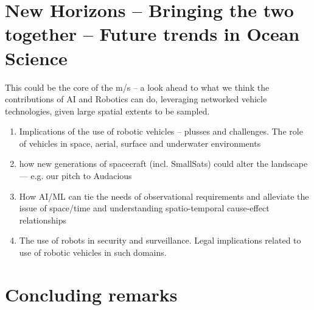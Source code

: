 \documentclass[12pt]{article}
\begin{document}
\section{New Horizons -- Bringing the two together -- Future trends in Ocean Science}

This could be the core of the m/s -- a look ahead to what we think the
contributions of AI and Robotics can do, leveraging networked vehicle
technologies, given large spatial extents to be sampled. 

\begin{enumerate} 

\item Implications of the use of robotic vehicles -- plusses and
  challenges. The role of vehicles in space, aerial, surface and
  underwater environments

\item how new generations of spacecraft (incl. SmallSats) could alter
  the landscape — e.g. our pitch to Audacious
  
\item How AI/ML can tie the needs of observational requirements and
  alleviate the issue of space/time and understanding spatio-temporal
  cause-effect relationships

\item The use of robots in security and surveillance. Legal implications
  related to use of robotic vehicles in such domains. 

\end{enumerate}


\section{Concluding remarks}




\footnotesize{
  
}
\end{document}
